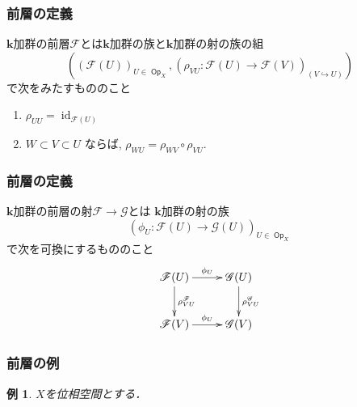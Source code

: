 \documentclass[dvipdfmx,12pt,aspectratio=169,leqno]{beamer}%
\newcommand{\kk}{\mathbf{k}}
\numberwithin{equation}{subsection}
\newcommand{\Op}{\mathop{\textsf{Op}}\nolimits}
\newcommand{\id}{\mathop{\mathrm{id}}\nolimits}
\theoremstyle{mystyle}
\newtheorem{EG}[AXM]{例}
\begin{document}
\begin{frame}
    \frametitle{前層の定義}

    \begin{definition}[前層]
        \(\kk\)加群の前層\(\mathscr{F}\)とは\(\kk\)加群の族と\(\kk\)加群の射の族の組\[\left(
        \left(\mathscr{F}(U)\right)_{U\in\Op_{X}},
        \left(\rho_{VU}\colon\mathscr{F}(U)\to\mathscr{F}(V)\right)_{(V\hookrightarrow U)}
    \right)\]で次をみたすもののこと
    \begin{enumerate}
        \item $\rho_{UU} = \id_{\mathscr{F}(U)}$ 
        \item $W \subset V \subset U$ ならば, 
        $\rho_{WU} = \rho_{WV} \circ \rho_{VU}$.\label{enum:res}
    \end{enumerate}
    \end{definition}
\end{frame}
\begin{frame}
    \frametitle{前層の定義}

    \begin{definition}[前層の射]
        \(\kk\)加群の前層の射\(\mathscr{F}\to\mathscr{G}\)とは
        \(\kk\)加群の射の族\[
            (\phi_{U}\colon \mathscr{F}(U)
            \to \mathscr{G}(U))_{U\in\Op_{X}}
        \]
        で次を可換にするもののこと
        \[\vcenter{\xymatrix@C=26pt@R=26pt{
            \mathscr{F}(U)
            \ar[r]^-{\phi_{U}}
            \ar[d]^-{\rho^{\mathscr{F}}_{VU}}
            &
            \mathscr{G}(U)
            \ar[d]^-{\rho^{\mathscr{G}}_{VU}} 
            \\
            \mathscr{F}(V)
            \ar[r]^-{\phi_{U}}
            &
            \mathscr{G}(V)
            }}
        \]
    \end{definition}
\end{frame}
\begin{frame}
    \frametitle{前層の例}
\begin{EG}
    \(X\)を位相空間とする．
\end{EG}
\end{frame}
\end{document}
